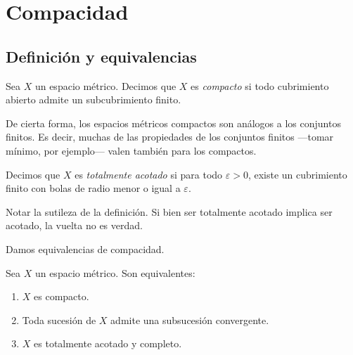 \chapter{Compacidad}

\section{Definición y equivalencias}

\begin{definition}
	Sea $X$ un espacio métrico. Decimos que $X$ es \emph{compacto} si todo cubrimiento abierto admite un subcubrimiento finito.
\end{definition}

De cierta forma, los espacios métricos compactos son análogos a los conjuntos finitos. Es decir, muchas de las propiedades de los conjuntos finitos ---tomar mínimo, por ejemplo--- valen también para los compactos.

\begin{definition}
	Decimos que $X$ es \emph{totalmente acotado} si para todo $\varepsilon > 0$, existe un cubrimiento finito con bolas de radio menor o igual a $\varepsilon$.
\end{definition}

\begin{remark}
	Notar la sutileza de la definición. Si bien ser totalmente acotado implica ser acotado, la vuelta no es verdad.
\end{remark}

Damos equivalencias de compacidad.
\begin{theorem}
	Sea $X$ un espacio métrico. Son equivalentes:
	\begin{enumerate}
		\item $X$ es compacto.
		\item Toda sucesión de $X$ admite una subsucesión convergente.
		\item $X$ es totalmente acotado y completo.
	\end{enumerate}
\end{theorem}

